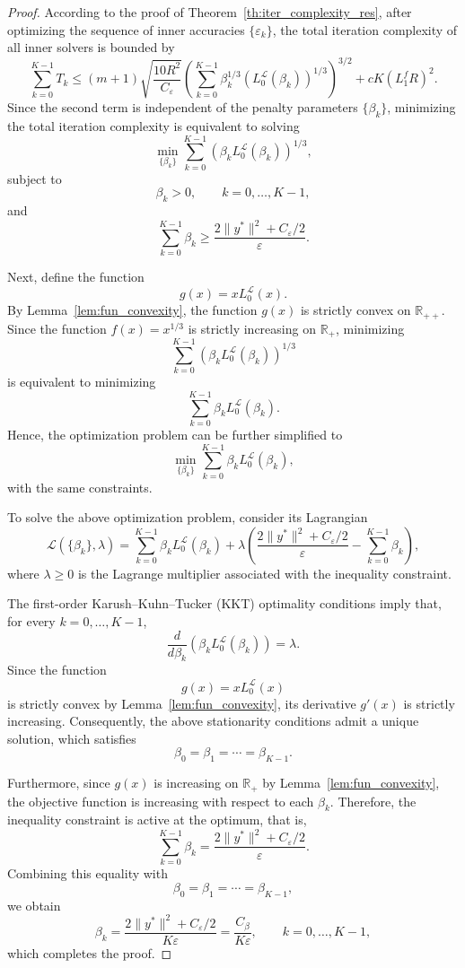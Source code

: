 \documentclass[runningheads]{llncs}
\begin{document}
	\begin{proof}
		According to the proof of Theorem~\ref{th:iter_complexity_res}, after optimizing the sequence of inner accuracies $\{\varepsilon_k\}$, the total iteration complexity of all inner solvers is bounded by
		\[
		\sum_{k=0}^{K-1}T_k
		\leq
		(m+1)
		\sqrt{\frac{10R^2}{C_\varepsilon}}
		\left(
		\sum_{k=0}^{K-1}
		\beta_k^{1/3}
		\left(L_0^{\mathcal L}(\beta_k)\right)^{1/3}
		\right)^{3/2}
		+
		cK(L_1^fR)^2.
		\]
		Since the second term is independent of the penalty parameters $\{\beta_k\}$, minimizing the total iteration complexity is equivalent to solving
		\[
		\min_{\{\beta_k\}}
		\sum_{k=0}^{K-1}
		\left( \beta_k L_0^{\mathcal L}(\beta_k)\right)^{1/3},
		\]
		subject to
		\[
		\beta_k>0,\qquad k=0,\ldots,K-1,
		\]
		and
		\[
		\sum_{k=0}^{K-1}\beta_k
		\geq
		\frac{2\|y^*\|^2+C_\varepsilon/2}{\varepsilon}.
		\]
		
		Next, define the function
		\[
		g(x)=xL_0^{\mathcal L}(x).
		\]
		By Lemma~\ref{lem:fun_convexity}, the function $g(x)$ is strictly convex on $\mathbb{R}_{++}$. Since the function $f(x) = x^{1/3}$ is strictly increasing on $\mathbb{R}_{+}$, minimizing
		\[
		\sum_{k=0}^{K-1}
		\left(\beta_k L_0^{\mathcal L}(\beta_k)\right)^{1/3}
		\]
		is equivalent to minimizing
		\[
		\sum_{k=0}^{K-1}
		\beta_kL_0^{\mathcal L}(\beta_k).
		\]
		Hence, the optimization problem can be further simplified to
		\[
		\min_{\{\beta_k\}}
		\sum_{k=0}^{K-1}
		\beta_kL_0^{\mathcal L}(\beta_k),
		\]
		with the same constraints.
		
		To solve the above optimization problem, consider its Lagrangian
		\[
		\mathcal{L}(\{\beta_k\},\lambda)
		=
		\sum_{k=0}^{K-1}
		\beta_kL_0^{\mathcal L}(\beta_k)
		+
		\lambda
		\left(
		\frac{2\|y^*\|^2+C_\varepsilon/2}{\varepsilon}
		-
		\sum_{k=0}^{K-1}\beta_k
		\right),
		\]
		where $\lambda\geq0$ is the Lagrange multiplier associated with the inequality constraint.
		
		The first-order Karush--Kuhn--Tucker (KKT) optimality conditions imply that, for every
		$k=0,\ldots,K-1$,
		\[
		\frac{d}{d\beta_k}
		\left(
		\beta_kL_0^{\mathcal L}(\beta_k)
		\right)
		=
		\lambda.
		\]
		Since the function
		\[
		g(x)=xL_0^{\mathcal L}(x)
		\]
		is strictly convex by Lemma~\ref{lem:fun_convexity}, its derivative $g'(x)$ is strictly increasing. Consequently, the above stationarity conditions admit a unique solution, which satisfies
		\[
		\beta_0=\beta_1=\cdots=\beta_{K-1}.
		\]
		
		Furthermore, since $g(x)$ is increasing on $\mathbb{R}_+$ by Lemma~\ref{lem:fun_convexity}, the objective function is increasing with respect to each $\beta_k$. Therefore, the inequality constraint is active at the optimum, that is,
		\[
		\sum_{k=0}^{K-1}\beta_k
		=
		\frac{2\|y^*\|^2+C_\varepsilon/2}{\varepsilon}.
		\]
		Combining this equality with
		\[
		\beta_0=\beta_1=\cdots=\beta_{K-1},
		\]
		we obtain
		\[
		\beta_k
		=
		\frac{2\|y^*\|^2+C_\varepsilon/2}{K\varepsilon}
		=
		\frac{C_\beta}{K\varepsilon},
		\qquad
		k=0,\ldots,K-1,
		\]
		which completes the proof.
	\end{proof}
	
\end{document}
